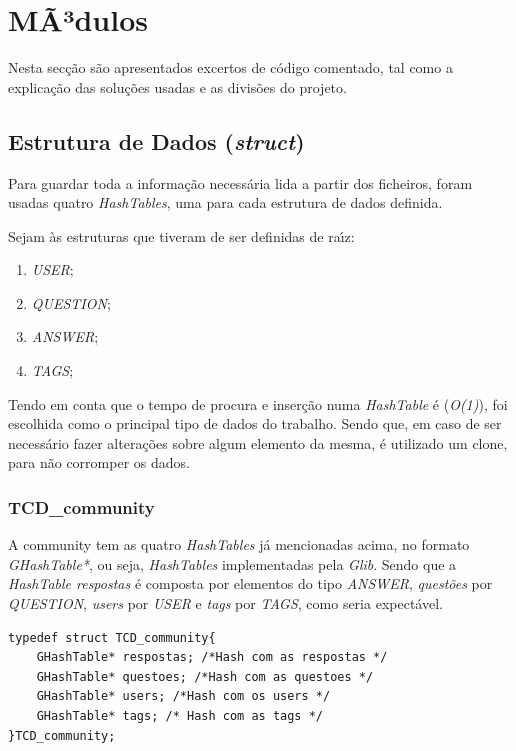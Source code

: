 \documentclass{article}
\begin{document}
\newpage

\section{MÃ³dulos}
\par Nesta sec\c{c}\~{a}o s\~{a}o apresentados excertos de c\'{o}digo comentado, tal como a explica\c{c}\~{a}o das solu\c{c}\~{o}es usadas e as divis\~{o}es do projeto.

\subsection{Estrutura de Dados (\emph{struct})}
\par Para guardar toda a informa\c{c}\~{a}o necess\'{a}ria lida a partir dos ficheiros, foram usadas quatro \emph{HashTables}, uma para cada estrutura de dados definida.

\par Sejam \`{a}s estruturas que tiveram de ser definidas de ra\'{\i}z:
\begin{enumerate}
\item  \emph{USER};
\item \emph{QUESTION};
\item \emph{ANSWER};
\item \emph{TAGS};
\end{enumerate}

\par Tendo em conta que o tempo de procura e inser\c{c}\~{a}o numa \emph{HashTable} \'{e} (\emph{O(1)}), foi escolhida como o principal tipo de dados do trabalho. Sendo que, em caso de ser necess\'{a}rio fazer altera\c{c}\~{o}es sobre algum elemento da mesma, \'{e} utilizado um clone, para n\~{a}o corromper os dados.

\subsubsection{TCD\_community}
\par A community tem as quatro \emph{HashTables} j\'{a} mencionadas acima, no formato \emph{GHashTable*}, ou seja, \emph{HashTables} implementadas pela \emph{Glib}. Sendo que a \emph{HashTable respostas} \'{e} composta por elementos do tipo \emph{ANSWER}, \emph{quest\~{o}es} por\emph{ QUESTION}, \emph{users} por \emph{USER} e  \emph{tags} por \emph{TAGS}, como seria expect\'{a}vel.

\begin{lstlisting}
typedef struct TCD_community{
    GHashTable* respostas; /*Hash com as respostas */   
    GHashTable* questoes; /*Hash com as questoes */
    GHashTable* users; /*Hash com os users */
    GHashTable* tags; /* Hash com as tags */
}TCD_community;
\end{lstlisting}
\end{document}
